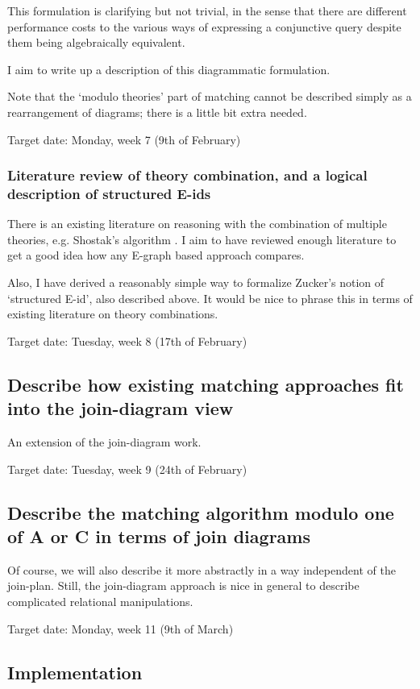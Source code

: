 \documentclass{article}
\theoremstyle{definition}
\begin{document}
This formulation is clarifying but not trivial, in the sense that there are different performance costs to the various ways of expressing a conjunctive query despite them being algebraically equivalent.

I aim to write up a description of this diagrammatic formulation.

Note that the `modulo theories' part of matching cannot be described simply as a rearrangement of diagrams; there is a little bit extra needed.

Target date: Monday, week 7 (9th of February)

\subsubsection{Literature review of theory combination, and a logical description of structured E-ids}
There is an existing literature on reasoning with the combination of multiple theories, e.g. Shostak's algorithm \cite{raniseringeissentran2005congclos}. I aim to have reviewed enough literature to get a good idea how any E-graph based approach compares.

Also, I have derived a reasonably simple way to formalize Zucker's notion of `structured E-id', also described above. It would be nice to phrase this in terms of existing literature on theory combinations.

Target date: Tuesday, week 8 (17th of February)

\subsection{Describe how existing matching approaches fit into the join-diagram view}
An extension of the join-diagram work.

Target date: Tuesday, week 9 (24th of February)

\subsection{Describe the matching algorithm modulo one of A or C in terms of join diagrams}
Of course, we will also describe it more abstractly in a way independent of the join-plan. Still, the join-diagram approach is nice in general to describe complicated relational manipulations.

Target date: Monday, week 11 (9th of March)

\subsection{Implementation}
\end{document}
